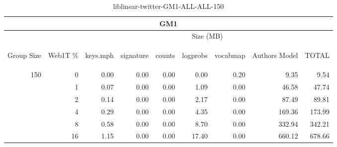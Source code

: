 \begin{center}
\begin{table}[htbp]
\begin{tabular}{ | r | r | r | r | r | r | r | r | r |}
\hline
\multicolumn{9}{|c|}{GM1}\\
\hline
 & & \multicolumn{7}{|c|}{Size (MB)}\\ \cline{3-9}
\begin{sideways}Group Size\end{sideways} & \begin{sideways}Web1T \% \end{sideways} & \begin{sideways}keys.mph\end{sideways} & \begin{sideways}signature\end{sideways} & \begin{sideways}counts\end{sideways} & \begin{sideways}logprobs\end{sideways} & \begin{sideways}vocabmap\end{sideways} & \begin{sideways}Authors Model \end{sideways} & \begin{sideways}TOTAL\end{sideways}\\
\hline
\multirow{5}{*}{150}
 & 0 & 0.00 & 0.00 & 0.00 & 0.00 & 0.20 & 9.35 & 9.54\\ \cline{2-9}
 & 1 & 0.07 & 0.00 & 0.00 & 1.09 & 0.00 & 46.58 & 47.74\\ \cline{2-9}
 & 2 & 0.14 & 0.00 & 0.00 & 2.17 & 0.00 & 87.49 & 89.81\\ \cline{2-9}
 & 4 & 0.29 & 0.00 & 0.00 & 4.35 & 0.00 & 169.36 & 173.99\\ \cline{2-9}
 & 8 & 0.58 & 0.00 & 0.00 & 8.70 & 0.00 & 332.94 & 342.21\\ \cline{2-9}
 & 16 & 1.15 & 0.00 & 0.00 & 17.40 & 0.00 & 660.12 & 678.66\\ \cline{2-9}
\hline
\end{tabular}
\caption{liblinear-twitter-GM1-ALL-ALL-150}
\label{table:liblinear-twitter-GM1-ALL-ALL-150}
\end{table}
\end{center}

